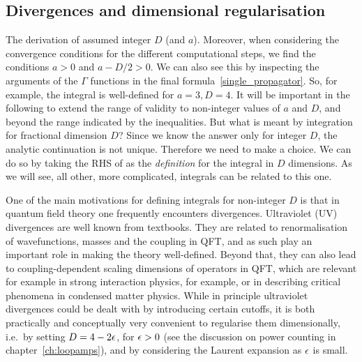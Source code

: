 \subsection{Divergences and dimensional regularisation}
\label{sec:DimReg}
The derivation of  assumed integer $D$ (and $a$).
Moreover, when considering the convergence conditions for the different computational steps, we find the conditions $a>0$ and $a-D/2>0$.
We can also see this by inspecting the arguments of the $\Gamma$ functions in the final formula~\eqref{single_propagator}.
So, for example, the integral is well-defined for $a=3, D=4$.
It will be important in the following to extend the range of validity to non-integer values of $a$ and $D$, and beyond the range indicated by the inequalities.
But what is meant by integration for fractional dimension $D$?
Since we know the answer only for integer $D$, the analytic continuation is not unique. 
Therefore we need to make a choice. 
We can do so by taking the RHS of  as the {\it definition} for the integral in $D$ dimensions.
As we will see, all other, more complicated, integrals can be related to this one.

One of the main motivations for defining integrals for non-integer $D$ is that in quantum field theory one frequently encounters divergences.
Ultraviolet (UV) divergences are well known from textbooks. 
They are related to renormalisation of wavefunctions, masses and the coupling in QFT, and as such play an important role in making the theory well-defined. Beyond that, they can also lead to coupling-dependent scaling dimensions of operators in QFT, which are relevant for example in strong interaction physics, for example, or in describing critical phenomena in condensed matter physics. 
While in principle ultraviolet divergences could be dealt with by introducing certain cutoffs, it is both practically and conceptually very convenient to regularise them dimensionally, i.e.\ by setting $D=4-2\epsilon$, for $\epsilon>0$  (see the discussion on power counting in chapter~\ref{ch:loopamps}), and by considering the Laurent expansion as $\epsilon$ is small.

